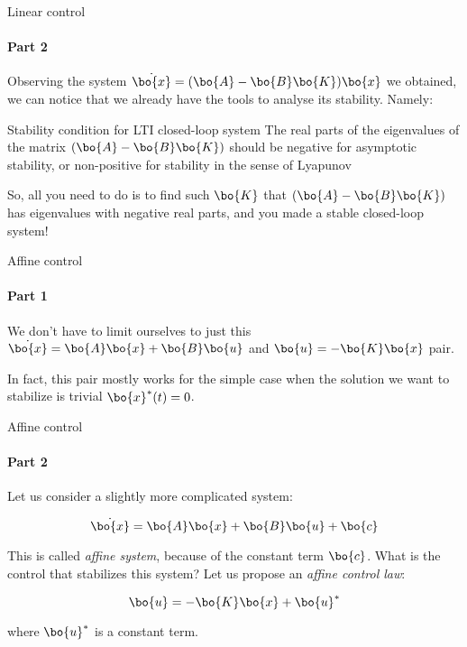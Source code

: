 \documentclass{beamer}
\begin{document}
\begin{frame}{Linear control}
\framesubtitle{Part 2}
\begin{flushleft}

Observing the system $\dot{\bo{x}} = (\bo{A} - \bo{B}\bo{K})\bo{x}$ we obtained, we can notice that we already have the tools to analyse its stability. Namely:

\begin{block}{Stability condition for LTI closed-loop system}
The real parts of the eigenvalues of the matrix $(\bo{A} - \bo{B}\bo{K})$ should be negative for asymptotic stability, or non-positive for stability in the sense of Lyapunov
\end{block}


\bigskip

So, all you need to do is to find such $\bo{K}$ that $(\bo{A} - \bo{B}\bo{K})$ has eigenvalues with negative real parts, and you made a stable closed-loop system!

\end{flushleft}
\end{frame}




\begin{frame}{Affine control}
\framesubtitle{Part 1}
\begin{flushleft}

We don't have to limit ourselves to just this $\dot{\bo{x}} = \bo{A}\bo{x} + \bo{B}\bo{u}$ and $\bo{u} = -\bo{K}\bo{x}$ pair. 

\bigskip

In fact, this pair mostly works for the simple case when the solution we want to stabilize is trivial $\bo{x}^*(t) = 0$.


\end{flushleft}
\end{frame}



\begin{frame}{Affine control}
\framesubtitle{Part 2}
\begin{flushleft}

Let us consider a slightly more complicated system:

\begin{equation}
    \dot{\bo{x}} = \bo{A}\bo{x} + \bo{B}\bo{u} + \bo{c}
\end{equation}

This is called \emph{affine system}, because of the constant term $\bo{c}$. What is the control that stabilizes this system? Let us propose an \emph{affine control law}:

\begin{equation}
    \bo{u} = -\bo{K}\bo{x} + \bo{u}^*
\end{equation}

where $\bo{u}^*$ is a constant term.

\end{flushleft}
\end{frame}
\end{document}
